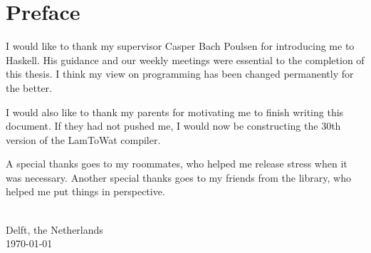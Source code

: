 
\chapter{\label{chap:Preface}Preface}

I would like to thank my supervisor Casper Bach Poulsen for introducing me to Haskell. His guidance and our weekly meetings were essential to the completion of this thesis. I think my view on programming has been changed permanently for the better.

I would also like to thank my parents for motivating me to finish writing this document. If they had not pushed me, I would now be constructing the 30th version of the LamToWat compiler.

A special thanks goes to my roommates, who helped me release stress when it was necessary. Another special thanks goes to my friends from the library, who helped me put things in perspective.

\vspace{1cm}
\begin{flushright}
\theauthor{}\\
Delft, the Netherlands\\
\today{}\\
\end{flushright}
